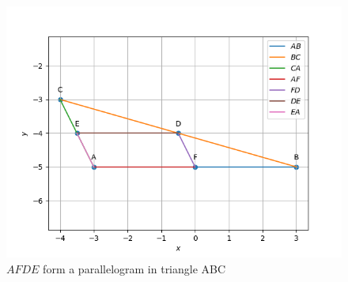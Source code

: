 \documentclass[11pt]{book}
\begin{document}
\begin{enumerate}[label=\thesection.\arabic*.,ref=\thesection.\theenumi]
\begin{figure}
\includegraphics[width=\columnwidth]{figs/llgram.png}
\caption{$AFDE$ form a parallelogram in triangle ABC}
\label{fig:Triangle}
\end{figure}
\end{enumerate}














%
\end{document}

